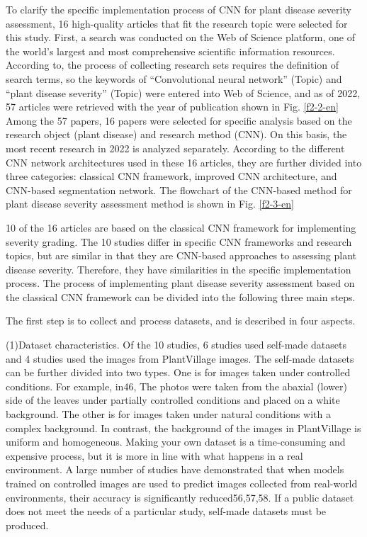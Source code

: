 To clarify the specific implementation process of CNN for plant disease severity assessment, 16 high-quality articles that fit the research topic were selected for this study. First, a search was conducted on the Web of Science platform, one of the world's largest and most comprehensive scientific information resources. According to, the process of collecting research sets requires the definition of search terms, so the keywords of “Convolutional neural network” (Topic) and “plant disease severity” (Topic) were entered into Web of Science, and as of 2022, 57 articles were retrieved with the year of publication shown in Fig. \ref{f2-2-en} Among the 57 papers, 16 papers were selected for specific analysis based on the research object (plant disease) and research method (CNN). On this basis, the most recent research in 2022 is analyzed separately. According to the different CNN network architectures used in these 16 articles, they are further divided into three categories: classical CNN framework, improved CNN architecture, and CNN-based segmentation network. The flowchart of the CNN-based method for plant disease severity assessment method is shown in Fig. \ref{f2-3-en}



10 of the 16 articles are based on the classical CNN framework for implementing severity grading. The 10 studies differ in specific CNN frameworks and research topics, but are similar in that they are CNN-based approaches to assessing plant disease severity. Therefore, they have similarities in the specific implementation process. The process of implementing plant disease severity assessment based on the classical CNN framework can be divided into the following three main steps.

The first step is to collect and process datasets, and is described in four aspects.

(1)Dataset characteristics. Of the 10 studies, 6 studies used self-made datasets and 4 studies used the images from PlantVillage images. The self-made datasets can be further divided into two types. One is for images taken under controlled conditions. For example, in46, The photos were taken from the abaxial (lower) side of the leaves under partially controlled conditions and placed on a white background. The other is for images taken under natural conditions with a complex background. In contrast, the background of the images in PlantVillage is uniform and homogeneous. Making your own dataset is a time-consuming and expensive process, but it is more in line with what happens in a real environment. A large number of studies have demonstrated that when models trained on controlled images are used to predict images collected from real-world environments, their accuracy is significantly reduced56,57,58. If a public dataset does not meet the needs of a particular study, self-made datasets must be produced.

